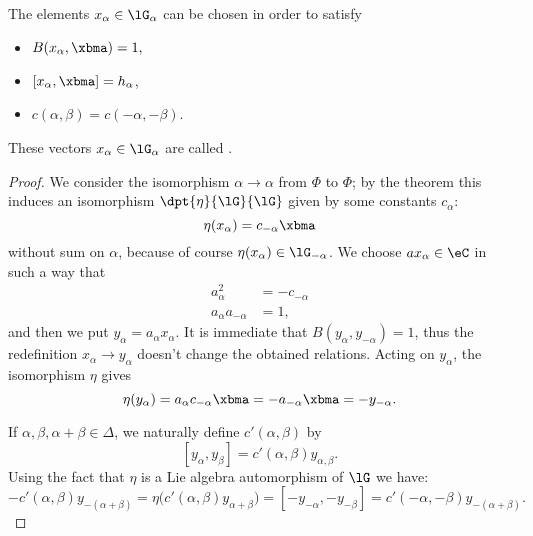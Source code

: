 \begin{corollary}
	The elements $ x_{\alpha}\in\lG_{\alpha}$ can be chosen in order to satisfy

	\begin{itemize}
		\item $B( x_{\alpha},\xbma)=1,$
		\item $[ x_{\alpha},\xbma]= h_{\alpha}$,
		\item $c(\alpha,\beta)=c(-\alpha,-\beta)$.
	\end{itemize}

\end{corollary}

These vectors $ x_{\alpha}\in\lG_{\alpha}$ are called .

\begin{proof}
	We consider the isomorphism $\alpha\to\alpha$ from $\Phi$ to $\Phi$; by the theorem this induces an isomorphism $\dpt{\eta}{\lG}{\lG}$ given by some constants $c_{\alpha}$:
	\[
		\eta( x_{\alpha})=c_{-\alpha}\xbma
	\]
	without sum on $\alpha$, because of course $\eta( x_{\alpha})\in\lG_{-\alpha}$. We choose $a x_{\alpha}\in\eC$ in such a way that
	\begin{subequations}
		\begin{align}
			a_{\alpha}^2           & =-c_{-\alpha} \\
			a_{\alpha} a_{-\alpha} & =1,
		\end{align}
	\end{subequations}
	and then we put $y_{\alpha}=a_{\alpha} x_{\alpha}$. It is immediate that $B(y_{\alpha},y_{-\alpha})=1$, thus the redefinition $ x_{\alpha}\to y_{\alpha}$ doesn't change the obtained relations. Acting on $y_{\alpha}$, the isomorphism $\eta$ gives
	\begin{equation}
		\eta(y_{\alpha})=a_{\alpha} c_{-\alpha}\xbma
		=-a_{-\alpha}\xbma
		=-y_{-\alpha}.
	\end{equation}

	If $\alpha,\beta,\alpha+\beta\in\Delta$, we naturally define $c'(\alpha,\beta)$ by
	\[
		[y_{\alpha},y_{\beta}]=c'(\alpha,\beta)y_{\alpha,\beta}.
	\]
	Using the fact that $\eta$ is a Lie algebra automorphism of $\lG$ we have:
	\begin{equation}
		-c'(\alpha,\beta)y_{-(\alpha+\beta)}=\eta\big(  c'(\alpha,\beta)y_{\alpha+\beta}   \big)
		=[-y_{-\alpha},-y_{-\beta}]
		=c'(-\alpha,-\beta)y_{-(\alpha+\beta)}.
	\end{equation}
\end{proof}

